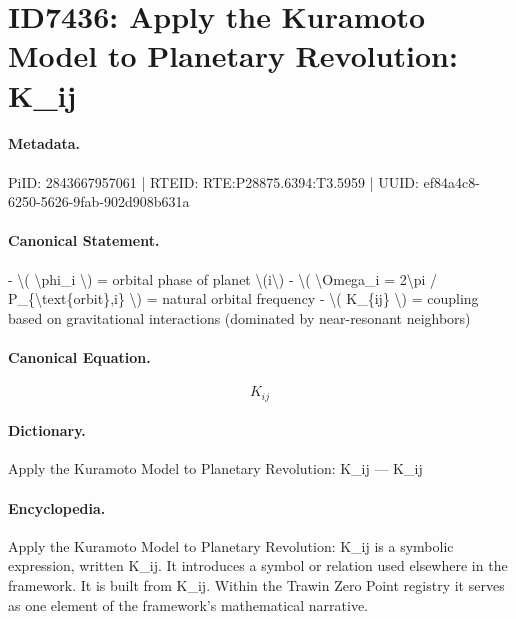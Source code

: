 \section*{ID7436: Apply the Kuramoto Model to Planetary Revolution: K\_ij}
\paragraph{Metadata.}
PiID: 2843667957061 | RTEID: RTE:P28875.6394:T3.5959 | UUID: ef84a4c8-6250-5626-9fab-902d908b631a

\paragraph{Canonical Statement.}
- \textbackslash{}( \textbackslash{}phi\_i \textbackslash{}) = orbital phase of planet \textbackslash{}(i\textbackslash{}) - \textbackslash{}( \textbackslash{}Omega\_i = 2\textbackslash{}pi / P\_\{\textbackslash{}text\{orbit\},i\} \textbackslash{}) = natural orbital frequency - \textbackslash{}( K\_\{ij\} \textbackslash{}) = coupling based on gravitational interactions (dominated by near-resonant neighbors)

\paragraph{Canonical Equation.}
\[
K_{ij}
\]

\paragraph{Dictionary.}
Apply the Kuramoto Model to Planetary Revolution: K\_ij — K\_ij

\paragraph{Encyclopedia.}
Apply the Kuramoto Model to Planetary Revolution: K\_ij is a symbolic expression, written K\_ij. It introduces a symbol or relation used elsewhere in the framework. It is built from K\_ij. Within the Trawin Zero Point registry it serves as one element of the framework's mathematical narrative.
